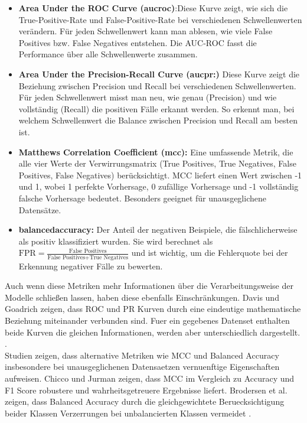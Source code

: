 \documentclass[a4paper,12pt]{article}
\begin{document}
	\begin{itemize}
		\item \textbf{Area Under the ROC Curve (\gls{aucroc})}:Diese Kurve zeigt, wie sich die True-Positive-Rate und False-Positive-Rate bei verschiedenen Schwellenwerten verändern. Für jeden Schwellenwert kann man ablesen, wie viele False Positives bzw. False Negatives entstehen. Die AUC-ROC fasst die Performance über alle Schwellenwerte zusammen.
		\item \textbf{Area Under the Precision-Recall Curve (\gls{aucpr}:)} Diese Kurve zeigt die Beziehung zwischen Precision und Recall bei verschiedenen Schwellenwerten. Für jeden Schwellenwert misst man neu, wie genau (Precision) und wie vollständig (Recall) die positiven Fälle erkannt werden. So erkennt man, bei welchem Schwellenwert die Balance zwischen Precision und Recall am besten ist.
		\item \textbf{Matthews Correlation Coefficient (\gls{mcc}):} Eine umfassende Metrik, die alle vier Werte der Verwirrungsmatrix (True Positives, True Negatives, False Positives, False Negatives) berücksichtigt. MCC liefert einen Wert zwischen -1 und 1, wobei 1 perfekte Vorhersage, 0 zufällige Vorhersage und -1 vollständig falsche Vorhersage bedeutet. Besonders geeignet für unausgeglichene Datensätze.
		\item \textbf{\gls{balancedaccuracy}:} Der Anteil der negativen Beispiele, die fälschlicherweise als positiv klassifiziert wurden. Sie wird berechnet als \(\text{FPR} = \frac{\text{False Positives}}{\text{False Positives} + \text{True Negatives}}\) und ist wichtig, um die Fehlerquote bei der Erkennung negativer Fälle zu bewerten.
	\end{itemize}
	Auch wenn diese Metriken  mehr Informationen über die Verarbeitungsweise der Modelle schließen lassen, haben diese ebenfalls Einschränkungen. Davis und Goadrich zeigen, dass ROC und PR Kurven durch eine eindeutige mathematische Beziehung miteinander verbunden sind. Fuer ein gegebenes Datenset enthalten beide Kurven die gleichen Informationen, werden aber unterschiedlich dargestellt. \cite{davis2006relationship}.
	\\[0.5em]
	Studien zeigen, dass alternative Metriken wie MCC und Balanced Accuracy insbesondere bei unausgeglichenen Datensaetzen vernuenftige Eigenschaften aufweisen. Chicco und Jurman zeigen, dass MCC im Vergleich zu Accuracy und F1 Score robustere und wahrheitsgetreuere Ergebnisse liefert. Brodersen et al. zeigen, dass Balanced Accuracy durch die gleichgewichtete Beruecksichtigung beider Klassen Verzerrungen bei unbalancierten Klassen vermeidet \cite{chicco2020advantages, brodersen2010balanced}.
\end{document}
